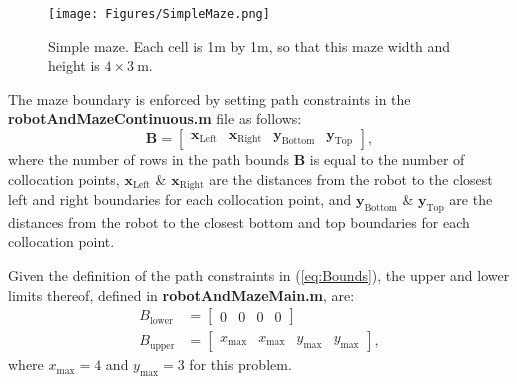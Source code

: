 \documentclass[12pt]{article}
\numberwithin{equation}{section} %
\numberwithin{figure}{section} %
\begin{document}
\begin{figure}[h!]
	\centering
	\texttt{[image: Figures/SimpleMaze.png]}
	\caption{Simple maze. Each cell is 1m by 1m, so that this maze width and height is $4 \times 3 \ \mathrm{m}$.}
	\label{fig:SimpleMaze}
\end{figure}

The maze boundary is enforced by setting path constraints in the \textbf{robotAndMazeContinuous.m} file as follows:
\begin{equation} \label{eq:Bounds}
	\boldsymbol{B} = \begin{bmatrix}
		\boldsymbol{x_\mathrm{Left}} & \boldsymbol{x_\mathrm{Right}} & \boldsymbol{y_\mathrm{Bottom}} & \boldsymbol{y_\mathrm{Top}}
	\end{bmatrix},
\end{equation}
where the number of rows in the path bounds $\boldsymbol{B}$ is equal to the number of collocation points, $\boldsymbol{x_\mathrm{Left}}$ \& $\boldsymbol{x_\mathrm{Right}}$ are the distances from the robot to the closest left and right boundaries for each collocation point, and $\boldsymbol{y_\mathrm{Bottom}}$ \& $\boldsymbol{y_\mathrm{Top}}$ are the distances from the robot to the closest bottom and top boundaries for each collocation point.

Given the definition of the path constraints in (\ref{eq:Bounds}), the upper and lower limits thereof, defined in \textbf{robotAndMazeMain.m}, are:
\begin{align}
	B_\mathrm{lower} &= \begin{bmatrix}
		0 & 0 & 0 & 0
	\end{bmatrix} \\
	B_\mathrm{upper} &= \begin{bmatrix}
		x_\mathrm{max} & x_\mathrm{max} & y_\mathrm{max} & y_\mathrm{max}
	\end{bmatrix},
\end{align}
where $x_\mathrm{max}=4$ and $y_\mathrm{max}=3$ for this problem.
\end{document}
